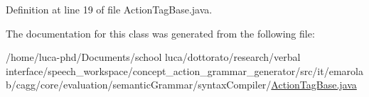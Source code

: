 Definition at line 19 of file Action\-Tag\-Base.\-java.



The documentation for this class was generated from the following file\-:\begin{DoxyCompactItemize}
\item 
/home/luca-\/phd/\-Documents/school luca/dottorato/research/verbal interface/speech\-\_\-workspace/concept\-\_\-action\-\_\-grammar\-\_\-generator/src/it/emarolab/cagg/core/evaluation/semantic\-Grammar/syntax\-Compiler/\hyperlink{ActionTagBase_8java}{Action\-Tag\-Base.\-java}\end{DoxyCompactItemize}
